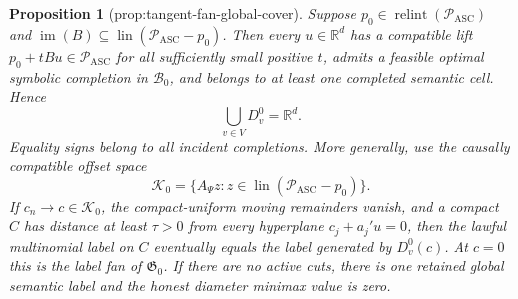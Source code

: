 \documentclass{article}
\newtheorem{proposition}{Proposition}
\begin{document}
\begin{proposition}[prop:tangent-fan-global-cover]\label{prop:tangent-fan-global-cover}
Suppose \(p_0\in\operatorname{relint}(\mathcal P_{\mathrm{ASC}})\) and \(\operatorname{im}(B)\subseteq\operatorname{lin}(\mathcal P_{\mathrm{ASC}}-p_0)\).  Then every \(u\in\mathbb R^d\) has a compatible lift \(p_0+tBu\in\mathcal P_{\mathrm{ASC}}\) for all sufficiently small positive \(t\), admits a feasible optimal symbolic completion in \(\mathcal B_0\), and belongs to at least one completed semantic cell.  Hence
\[
 \bigcup_{v\in V}D_v^0=\mathbb R^d.
\]
Equality signs belong to all incident completions.  More generally, use the causally compatible offset space
\[
 \mathcal K_0=\{A_\Psi z:z\in\operatorname{lin}(\mathcal P_{\mathrm{ASC}}-p_0)\}.
\]
If \(c_n\to c\in\mathcal K_0\), the compact-uniform moving remainders vanish, and a compact \(C\) has distance at least \(\tau>0\) from every hyperplane \(c_j+a_j'u=0\), then the lawful multinomial label on \(C\) eventually equals the label generated by \(D_v^0(c)\).  At \(c=0\) this is the label fan of \(\mathfrak G_0\).  If there are no active cuts, there is one retained global semantic label and the honest diameter minimax value is zero.
\end{proposition}
\end{document}
